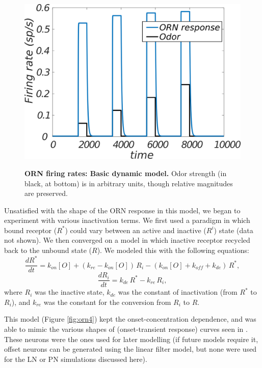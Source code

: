 \documentclass[a4paper,12pt,twoside]{article}
\begin{document}
\begin{figure}
\centering
\caption{\textbf{ORN firing rates: Basic dynamic model.}  Odor strength (in black, at bottom) is in arbitrary units, though relative magnitudes are preserved.\newline}
\hspace*{-1cm}
\includegraphics[scale=1]{2016-08-05DynORNnoInactivation.png}
\label{fig:orn3}
\end{figure}
Unsatisfied with the shape of the ORN response in this model, we began to experiment with various inactivation terms.  We first used a paradigm in which bound receptor ($R^*$) could vary between an active and inactive ($R^i$) state (data not shown).  We then converged on a model in which inactive receptor recycled back to the unbound state ($R$).  We modeled this with the following equations:
\begin{equation}
\frac{dR^*}{dt} = k_{on}[O] + (k_{re} - k_{on}[O])\,R_i - (k_{on}[O] + k_{off} + k_{de})\,R^*,
\end{equation}
\begin{equation}
\frac{dR_i}{dt} = k_{de} \,R^* - k_{re}\, R_i,
\end{equation}
where $R_i$ was the inactive state, $k_{de}$ was the constant of inactivation (from $R^*$ to $R_i$), and $k_{re}$ was the constant for the conversion from $R_i$ to $R.$  

This model (Figure \ref{fig:orn4}) kept the onset-concentration dependence, and was able to mimic the various shapes of (onset-transient response) curves seen in \cite{Nagel2011}.  These neurons were the ones used for later modelling (if future models require it, offset neurons can be generated using the linear filter model, but none were used for the LN or PN simulations discussed here).
\end{document}
